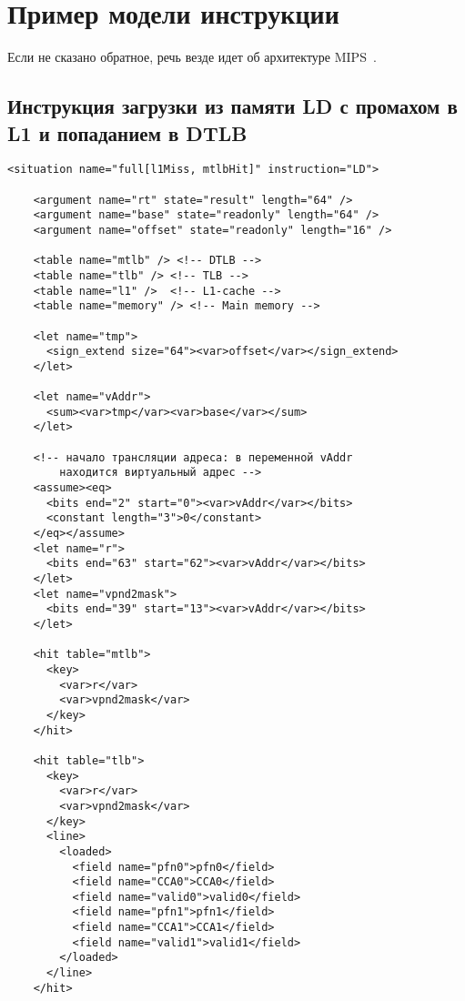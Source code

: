 \chapter{Пример модели инструкции}\label{sec:xml}

Если не сказано обратное, речь везде идет об архитектуре MIPS~\cite{mips64II}.

\section*{Инструкция загрузки из памяти LD с промахом в L1 и попаданием в DTLB}

\begin{verbatim}
<situation name="full[l1Miss, mtlbHit]" instruction="LD">

    <argument name="rt" state="result" length="64" />
    <argument name="base" state="readonly" length="64" />
    <argument name="offset" state="readonly" length="16" />

    <table name="mtlb" /> <!-- DTLB -->
    <table name="tlb" /> <!-- TLB -->
    <table name="l1" />  <!-- L1-cache -->
    <table name="memory" /> <!-- Main memory -->

    <let name="tmp">
      <sign_extend size="64"><var>offset</var></sign_extend>
    </let>

    <let name="vAddr">
      <sum><var>tmp</var><var>base</var></sum>
    </let>

    <!-- начало трансляции адреса: в переменной vAddr
        находится виртуальный адрес -->
    <assume><eq>
      <bits end="2" start="0"><var>vAddr</var></bits>
      <constant length="3">0</constant>
    </eq></assume>
    <let name="r">
      <bits end="63" start="62"><var>vAddr</var></bits>
    </let>
    <let name="vpnd2mask">
      <bits end="39" start="13"><var>vAddr</var></bits>
    </let>

    <hit table="mtlb">
      <key>
        <var>r</var>
        <var>vpnd2mask</var>
      </key>
    </hit>

    <hit table="tlb">
      <key>
        <var>r</var>
        <var>vpnd2mask</var>
      </key>
      <line>
        <loaded>
          <field name="pfn0">pfn0</field>
          <field name="CCA0">CCA0</field>
          <field name="valid0">valid0</field>
          <field name="pfn1">pfn1</field>
          <field name="CCA1">CCA1</field>
          <field name="valid1">valid1</field>
        </loaded>
      </line>
    </hit>


\end{verbatim}
